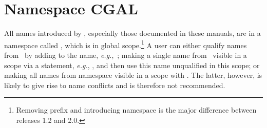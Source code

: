 \section{Namespace CGAL}
All names introduced by \cgal, especially those documented in these manuals,
are in a namespace called , which is in global 
scope.\footnote{Removing prefix  and introducing namespace 
 is the major difference between releases 1.2 and 2.0.} 
A user can either qualify names from \cgal\ by adding  to the name,
\textit{e.g.},\ ; making a 
single name from \cgal\ visible in a scope via a  statement, 
\textit{e.g.}, , and then use this name 
unqualified in this scope; or making all names from namespace  
visible in a scope with . The latter, however, is 
likely to give rise to name conflicts and is therefore not recommended.   
